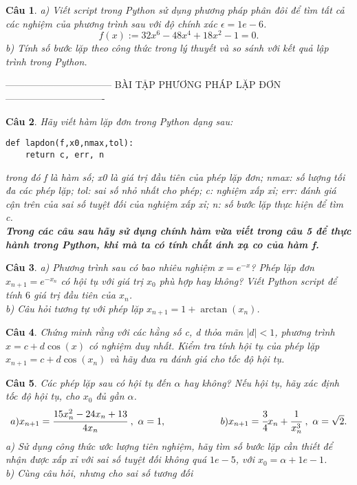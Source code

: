 \documentclass[11pt]{article}
\newtheorem{bt}{Câu}
\begin{document}
\begin{bt}
	a) Viết script trong Python sử dụng phương pháp phân đôi để tìm tất cả các nghiệm của phương trình sau với độ chính xác $\epsilon=1e-6$.
	\[ f(x) := 32x^6 - 48x^4 +18x^2 - 1 = 0.  \] 
	b) Tính số bước lặp theo công thức trong lý thuyết và so sánh với kết quả lập trình trong Python.
\end{bt}

\centerline{——————————— BÀI TẬP PHƯƠNG PHÁP LẶP ĐƠN ——————————-}

\begin{bt}
	Hãy viết hàm lặp đơn trong Python dạng sau:
	\begin{lstlisting}[frame=single] 
	def lapdon(f,x0,nmax,tol):
	return c, err, n
	\end{lstlisting}
	trong đó f là hàm số; x0 là giá trị đầu tiên của phép lặp đơn; nmax: số lượng tối đa các phép lặp; tol: sai số nhỏ nhất cho phép; c: nghiệm xấp xỉ;
	err: đánh giá cận trên của sai số tuyệt đối của nghiệm xấp xỉ; n: số bước lặp thực hiện để tìm c.\\
	\textbf{Trong các câu sau hãy sử dụng chính hàm vừa viết trong câu 5 để thực hành trong Python, khi mà ta có tính chất ánh xạ co của hàm f.}
\end{bt}

\begin{bt} %
a) Phương trình sau có bao nhiêu nghiệm $x=e^{-x}$? Phép lặp đơn $x_{n+1}=e^{-x_n}$ có hội tụ với giá trị $x_0$ phù hợp hay không? Viết Python script để tính $6$ giá trị đầu tiên của $x_n$.\\
b) Câu hỏi tương tự với phép lặp $x_{n+1} = 1 + \arctan(x_n)$.
\end{bt}

\begin{bt} %
Chứng minh rằng với các hằng số c, d thỏa mãn $|d|<1$, phương trình $x=c+d \cos(x)$ có nghiệm duy nhất. Kiểm tra tính hội tụ của phép lặp $x_{n+1}=c+d \cos(x_n)$ và hãy đưa ra đánh giá cho tốc độ hội tụ.
\end{bt}

\begin{bt} %
Các phép lặp sau có hội tụ đến $\alpha$ hay không? Nếu hội tụ, hãy xác định tốc độ hội tụ, cho $x_0$ đủ gần $\alpha$.
%
\[
a) x_{n+1} = \cfrac{15 x_n^2-24x_n+13}{4x_n} \ , \ \alpha=1, \hskip 2cm \hfill  b) x_{n+1} = \cfrac{3}{4} x_n + \cfrac{1}{x_n^3} \ , \ \alpha=\sqrt{2}.
\]
%
a) Sử dụng công thức ước lượng tiên nghiệm, hãy tìm số bước lặp cần thiết để nhận được xấp xỉ với sai số tuyệt đối không quá $1e-5$, với $x_0 = \alpha + 1e-1$. \\
b) Cùng câu hỏi, nhưng cho sai số tương đối
\end{bt}
\end{document}
